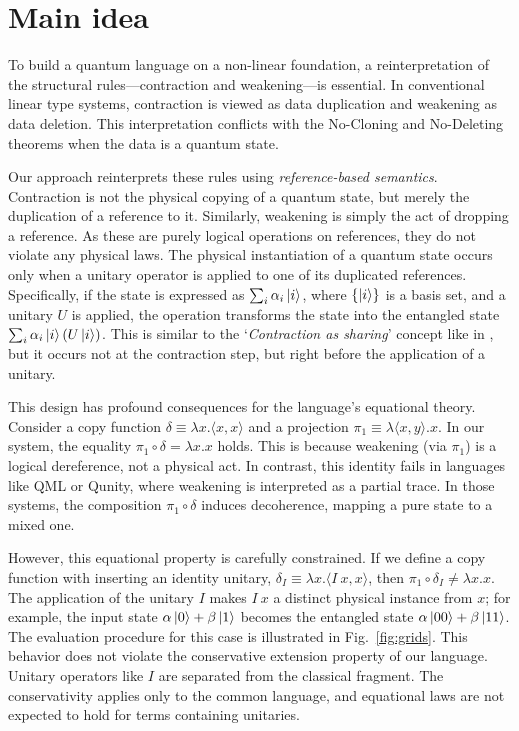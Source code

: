 
\section{Main idea} \label{sec:main-idea}
To build a quantum language on a non-linear foundation, a reinterpretation of the structural rules---contraction and weakening---is essential.
In conventional linear type systems, contraction is viewed as data duplication and weakening as data deletion.
This interpretation conflicts with the No-Cloning and No-Deleting theorems when the data is a quantum state.

Our approach reinterprets these rules using \textit{reference-based semantics}.
Contraction is not the physical copying of a quantum state, but merely the duplication of a reference to it.
Similarly, weakening is simply the act of dropping a reference.
As these are purely logical operations on references, they do not violate any physical laws.
The physical instantiation of a quantum state occurs only when a unitary operator is applied to one of its duplicated references.
Specifically, if the state is expressed as $\sum_i\alpha_i\ket{i}$, where $\{\ket{i}\}$ is a basis set, and a unitary $U$ is applied, the operation transforms the state into the entangled state $\sum_i\alpha_i\ket{i}(U\ket{i})$.
This is similar to the `\textit{Contraction as sharing}' concept like in \cite{ALTENKIRCH2005_FunctionalQuantumProgramming,ARRIGHI2004_OperationalSemanticsFormal}, but it occurs not at the contraction step, but right before the application of a unitary.

This design has profound consequences for the language's equational theory.
Consider a copy function $\delta \equiv \lambda x.\langle x,x\rangle$ and a projection $\pi_1 \equiv \lambda\langle x,y\rangle.x$. In our system, the equality $\pi_1\circ\delta=\lambda x. x$ holds.
This is because weakening (via $\pi_1$) is a logical dereference, not a physical act.
In contrast, this identity fails in languages like QML\cite{ALTENKIRCH2005_FunctionalQuantumProgramming} or Qunity\cite{VOICHICK2023_QunityUnifiedLanguage}, where weakening is interpreted as a partial trace.
In those systems, the composition $\pi_1\circ\delta$ induces decoherence, mapping a pure state to a mixed one.

However, this equational property is carefully constrained.
If we define a copy function with inserting an identity unitary, $\delta_I \equiv \lambda x.\langle I\ x,x\rangle$, then $\pi_1\circ\delta_I\ne\lambda x.x$.
The application of the unitary $I$ makes $I\ x$ a distinct physical instance from $x$; for example, the input state $\alpha\ket{0}+\beta\ket{1}$ becomes the entangled state $\alpha\ket{00}+\beta\ket{11}$.
The evaluation procedure for this case is illustrated in Fig.~\ref{fig:grids}.
This behavior does not violate the conservative extension property of our language.
Unitary operators like $I$ are separated from the classical fragment.
The conservativity applies only to the common language, and equational laws are not expected to hold for terms containing unitaries.

